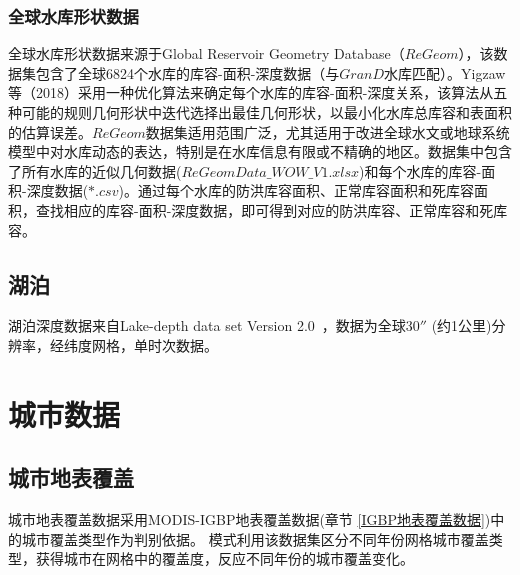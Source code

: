 \subsubsection{全球水库形状数据}

全球水库形状数据来源于Global Reservoir Geometry Database（$ReGeom$），该数据集包含了全球6824个水库的库容-面积-深度数据（与$GranD$水库匹配）。Yigzaw等（2018）采用一种优化算法来确定每个水库的库容-面积-深度关系，该算法从五种可能的规则几何形状中迭代选择出最佳几何形状，以最小化水库总库容和表面积的估算误差。$ReGeom$数据集适用范围广泛，尤其适用于改进全球水文或地球系统模型中对水库动态的表达，特别是在水库信息有限或不精确的地区。数据集中包含了所有水库的近似几何数据($ReGeomData\_WOW\_V1.xlsx$)和每个水库的库容-面积-深度数据($*.csv$)。通过每个水库的防洪库容面积、正常库容面积和死库容面积，查找相应的库容-面积-深度数据，即可得到对应的防洪库容、正常库容和死库容。


\subsection{湖泊}
湖泊深度数据来自Lake-depth data set Version 2.0~\citep{kourzeneva2012global}，数据为全球$30''$ (约1公里)分辨率，经纬度网格，单时次数据。

\section{城市数据}\label{城市数据}

\subsection{城市地表覆盖}\label{城市地表覆盖}
城市地表覆盖数据采用MODIS-IGBP地表覆盖数据(章节 \ref{IGBP地表覆盖数据})中的城市覆盖类型作为判别依据。
模式利用该数据集区分不同年份网格城市覆盖类型，获得城市在网格中的覆盖度，反应不同年份的城市覆盖变化。

